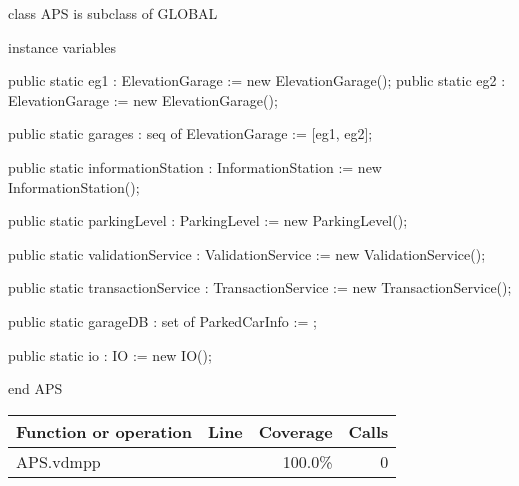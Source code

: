 \begin{vdmpp}[breaklines=true]
class APS is subclass of GLOBAL

instance variables

 public static eg1 : ElevationGarage := new ElevationGarage();
 public static eg2 : ElevationGarage := new ElevationGarage();

 public static garages : seq of ElevationGarage := [eg1, eg2];

 public static informationStation : InformationStation := new InformationStation();

 public static parkingLevel : ParkingLevel := new ParkingLevel();

 public static validationService : ValidationService := new ValidationService();

 public static transactionService : TransactionService := new TransactionService();

 public static garageDB : set of ParkedCarInfo := {}; 
 
 public static io : IO := new IO();

end APS


\end{vdmpp}
\bigskip
\begin{longtable}{|l|r|r|r|}
\hline
Function or operation & Line & Coverage & Calls \\
\hline
\hline
\hline
APS.vdmpp & & 100.0\% & 0 \\
\hline
\end{longtable}


